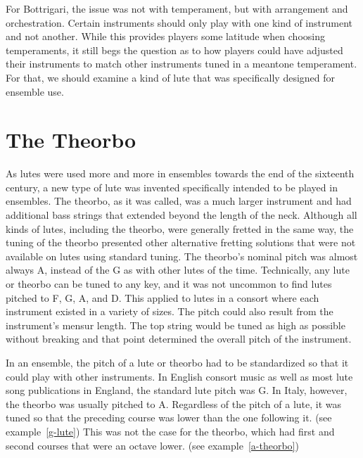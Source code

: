 For Bottrigari, the issue was not with temperament, but with arrangement and orchestration. Certain instruments should
only play with one kind of instrument and not another. While this provides players some latitude when choosing
temperaments, it still begs the question as to how players could have adjusted their instruments to match other
instruments tuned in a meantone temperament. For that, we should examine a kind of lute that was specifically designed
for ensemble use.

\section{The Theorbo}

As lutes were used more and more in ensembles towards the end of the sixteenth century, a new type of lute was invented
specifically intended to be played in ensembles. The theorbo, as it was called, was a much larger instrument and had
additional bass strings that extended beyond the length of the neck. Although all kinds of lutes, including the theorbo,
were generally fretted in the same way, the tuning of the theorbo presented other alternative fretting solutions that
were not available on lutes using standard tuning. The theorbo's nominal pitch was almost always A, instead of the G as
with other lutes of the time. Technically, any lute or theorbo can be tuned to any key, and it was not uncommon to find
lutes pitched to F, G, A, and D. This applied to lutes in a consort where each instrument existed in a variety of sizes.
The pitch could also result from the instrument's mensur length. The top string would be tuned as high as possible
without breaking and that point determined the overall pitch of the instrument.

In an ensemble, the pitch of a lute or theorbo had to be standardized so that it could play with other instruments. In
English consort music as well as most lute song publications in England, the standard lute pitch was G. In Italy,
however, the theorbo was usually pitched to A. Regardless of the pitch of a lute, it was tuned so that the preceding
course was lower than the one following it. (see example~\ref{g-lute}) This was not the case for the theorbo, which had
first and second courses that were an octave lower. (see example~\ref{a-theorbo})

